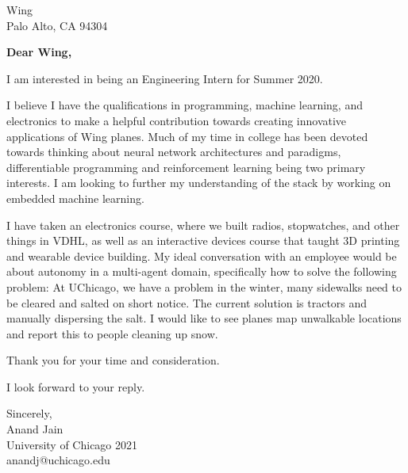 \documentclass[11pt,a4paper]{letter} %
\begin{document}
\begin{letter}{Wing  \\ Palo Alto, CA 94304} 

\opening{\textbf{Dear Wing,}}

I am interested in being an Engineering Intern for Summer 2020.

I believe I have the qualifications in programming, machine learning, and electronics to make a helpful contribution towards creating innovative applications of Wing planes.
Much of my time in college has been devoted towards thinking about neural network architectures and paradigms, differentiable programming and reinforcement learning being two primary interests. 
I am looking to further my understanding of the stack by working on embedded machine learning.

I have taken an electronics course, where we built radios, stopwatches, and other things in VDHL, as well as an interactive devices course that taught 3D printing and wearable device building. 
My ideal conversation with an employee would be about autonomy in a multi-agent domain, specifically how to solve the following problem: 
At UChicago, we have a problem in the winter, many sidewalks need to be cleared and salted on short notice. 
The current solution is tractors and manually dispersing the salt. 
I would like to see planes map unwalkable locations and report this to people cleaning up snow.

Thank you for your time and consideration.

I look forward to your reply.

\closing{Sincerely, \\ Anand Jain \\ University of Chicago 2021 \\ anandj@uchicago.edu}

\end{letter}
 
\end{document}
